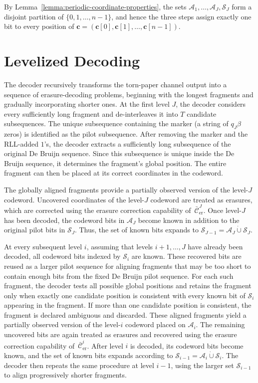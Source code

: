 \documentclass[journal,letterpaper,onecolumn,11pt]{IEEEtran}
\newcommand{\cA}{\mathcal{A}}
\newcommand{\cC}{\mathcal{C}}
\newcommand{\cS}{\mathcal{S}}
\newcommand{\boldc}{\mathbf{c}}
\begin{document}
By Lemma~\ref{lemma:periodic-coordinate-properties}, the sets $\cA_1,\ldots,\cA_J,\cS_J$ form a disjoint partition of $\{0,1,\ldots,n-1\}$, and hence the three steps assign exactly one bit to every position of $\boldc=(\boldc[0],\boldc[1],\ldots,\boldc[n-1])$.

\section{Levelized Decoding}\label{Section:levelized-decoding}
The decoder recursively transforms the torn-paper channel output into a sequence of erasure-decoding problems, beginning with the longest fragments and gradually incorporating shorter ones. 
At the first level \(J\), the decoder considers every sufficiently long fragment and de-interleaves it into \(T\) candidate subsequences. 
The unique subsequence containing the marker (a string of $q_J\beta$ zeros) is identified as the pilot subsequence. 
After removing the marker and the RLL-added $1$'s, the decoder extracts a sufficiently long subsequence of the original De Bruijn sequence. 
Since this subsequence is unique inside the De Bruijn sequence, it determines the fragment's global position.
The entire fragment can then be placed at its correct coordinates in the codeword.

The globally aligned fragments provide a partially observed version of the level-\(J\) codeword. 
Uncovered coordinates of the level-$J$ codeword are treated as erasures, which are corrected using the erasure correction capability of~$\bar{\cC}_{\mathrm{er}}^J$.
Once level-\(J\) has been decoded, the codeword bits in \(\cA_J\) become known in addition to the original pilot bits in \(\cS_J\).
Thus, the set of known bits expands to \(\cS_{J-1}=\cA_J\mathbin{\dot\cup}\cS_J\).

At every subsequent level \(i\), assuming that levels \(i+1,\ldots,J\) have already been decoded, all codeword bits indexed by \(\cS_i\) are known.
These recovered bits are reused as a larger pilot sequence for aligning fragments that may be too short to contain enough bits from  the fixed De Bruijn pilot sequence.
For each such fragment, the decoder tests all possible global
 positions and retains the fragment only when exactly one candidate position is consistent with every known bit of \(\cS_i\) appearing in the fragment. 
If more than one candidate position is consistent, the fragment is
declared ambiguous and discarded.
These aligned fragments yield a partially observed version of the level-\(i\) codeword placed on \(\cA_i\). 
The remaining uncovered bits are again treated as erasures and recovered using the erasure correction capability of~$\bar{\cC}_{\mathrm{er}}^i$.
After level \(i\) is decoded, its codeword bits become
known, and the set of known bits expands according to
\(\cS_{i-1}=\cA_i\mathbin{\dot\cup}\cS_i\). 
The decoder then repeats the same procedure at level \(i-1\), using the larger set \(\cS_{i-1}\) to align
progressively shorter fragments.
\end{document}
